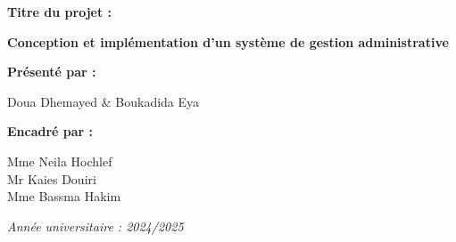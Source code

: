 \documentclass[a4paper,11pt]{report}
\begin{document}
\begin{titlepage}
  {\large\bfseries Titre du projet :}\par\vspace{1ex}
  \begin{tcolorbox}[
    colback=blue!10!white, colframe=blue!50!black,
    boxrule=1pt, arc=4pt,
    auto outer arc, halign=center,
    top=8pt, bottom=8pt, left=6pt, right=6pt,
    width=0.85\textwidth
  ]
    {\Large\bfseries Conception et implémentation d'un système de gestion administrative}
  \end{tcolorbox}\par\vspace{5ex}

  {\large\bfseries Présenté par :}\par\vspace{1ex}
  {\normalsize Doua Dhemayed \& Boukadida Eya}\par\vspace{5ex}

  {\large\bfseries Encadré par :}\par\vspace{1ex}
  {\normalsize
    Mme Neila Hochlef \\ Mr Kaies Douiri \\ Mme Bassma Hakim
  }\par\vspace{5ex}

  {\small\itshape Année universitaire : 2024/2025}

\end{titlepage}

\tableofcontents


\clearpage

\newpage 
\end{document}
